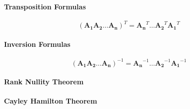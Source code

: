 \paragraph{Transposition Formulas}
\begin{equation}
(\mathbf{A_1 A_2 \ldots  A_n})^T = \mathbf{A_n}^T \ldots \mathbf{A_2}^T \mathbf{A_1}^T
\end{equation}


\paragraph{Inversion Formulas}
\begin{equation}
(\mathbf{A_1 A_2 \ldots  A_n})^{-1} = \mathbf{A_n}^{-1} \ldots \mathbf{A_2}^{-1} \mathbf{A_1}^{-1}
\end{equation}



\paragraph{Rank Nullity Theorem}


\paragraph{Cayley Hamilton Theorem}







